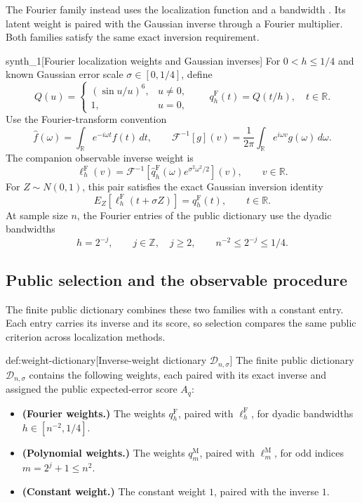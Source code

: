 \documentclass[11pt]{article}
\begin{document}
The Fourier family instead uses the localization function  and a bandwidth . Its latent weight  is paired with the Gaussian inverse  through a Fourier multiplier. Both families satisfy the same exact inversion requirement.

\begin{definitionv}{synth_1}[Fourier localization weights and Gaussian inverses]
For \(0<h\le1/4\) and known Gaussian error scale \(\sigma\in[0,1/4]\), define
\[
Q(u)=
\begin{cases}
(\sin u/u)^6,&u\ne0,\\
1,&u=0,
\end{cases}
\qquad
q_h^{\mathrm F}(t)=Q(t/h),\quad t\in\mathbb R.
\]
Use the Fourier-transform convention
\[
\widehat f(\omega)=\int_{\mathbb R}e^{-i\omega t}f(t)\,dt,
\qquad
\mathcal F^{-1}[g](v)=\frac1{2\pi}
\int_{\mathbb R}e^{i\omega v}g(\omega)\,d\omega.
\]
The companion observable inverse weight is
\[
\ell_h^{\mathrm F}(v)
=\mathcal F^{-1}\!\left[
\widehat q_h^{\mathrm F}(\omega)e^{\sigma^2\omega^2/2}
\right](v),\qquad v\in\mathbb R.
\]
For \(Z\sim N(0,1)\), this pair satisfies the exact Gaussian inversion identity
\[
E_Z\!\left[\ell_h^{\mathrm F}(t+\sigma Z)\right]
=q_h^{\mathrm F}(t),\qquad t\in\mathbb R.
\]
At sample size \(n\), the Fourier entries of the public dictionary use the dyadic bandwidths
\[
h=2^{-j},\qquad j\in\mathbb Z,\quad j\ge2,
\qquad n^{-2}\le2^{-j}\le1/4.
\]
\end{definitionv}

\subsection{Public selection and the observable procedure}

The finite public dictionary  combines these two families with a constant entry. Each entry carries its inverse and its score, so selection compares the same public criterion across localization methods.

\begin{definitionv}{def:weight-dictionary}[Inverse-weight dictionary \(\mathcal D_{n,\sigma}\)]
The finite public dictionary \(\mathcal D_{n,\sigma}\) contains the following weights, each paired with its exact inverse and assigned the public expected-error score \(A_q\):
\begin{itemize}
\item \textbf{(Fourier weights.)} The weights \(q_h^{\mathrm F}\), paired with \(\ell_h^{\mathrm F}\), for dyadic bandwidths \(h\in[n^{-2},1/4]\).
\item \textbf{(Polynomial weights.)} The weights \(q_m^{\mathrm M}\), paired with \(\ell_m^{\mathrm M}\), for odd indices \(m=2^j+1\le n^2\).
\item \textbf{(Constant weight.)} The constant weight \(1\), paired with the inverse \(1\).
\end{itemize}
\end{definitionv}
\end{document}
